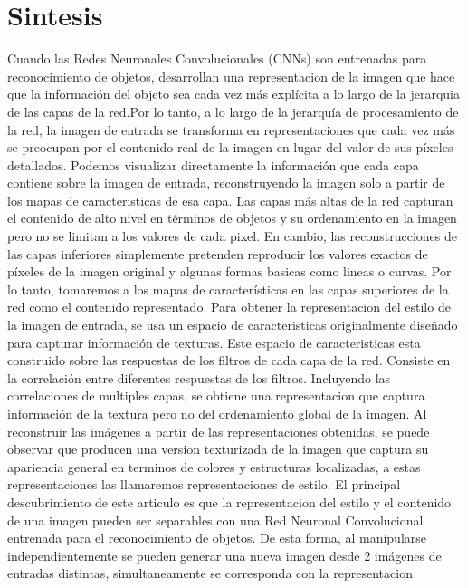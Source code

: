 \documentclass[a4paper,11pt,spanish]{book}
\begin{document}
    \section{Sintesis}
      Cuando las Redes Neuronales Convolucionales (CNNs) son entrenadas para reconocimiento de objetos, desarrollan una representacion de la imagen que hace que la información
      del objeto sea cada vez más explícita a lo largo de la jerarquia de las capas de la red.Por lo tanto, a lo largo de la jerarquía de procesamiento de la red,
      la imagen de entrada se transforma en representaciones que cada vez más se preocupan por el contenido real de la imagen en lugar del valor de sus píxeles detallados.
      Podemos visualizar directamente la información que cada capa contiene sobre la imagen de entrada, reconstruyendo la imagen solo a partir de los mapas de caracteristicas
      de esa capa. Las capas más altas de la red capturan el contenido de alto nivel en términos de objetos y su ordenamiento en la imagen pero no se limitan a los valores de cada
      pixel. En  cambio, las reconstrucciones de las capas inferiores simplemente pretenden reproducir los valores exactos de píxeles de la imagen original y algunas formas
      basicas como lineas o curvas. Por lo tanto, tomaremos a los mapas de características en las capas superiores de la red como el contenido representado.
      Para obtener la representacion del estilo de la imagen de entrada, se usa un espacio de caracteristicas originalmente diseñado para capturar información de texturas.
      Este espacio de caracteristicas esta construido sobre las respuestas de los filtros de cada capa de la red. Consiste en la correlación entre diferentes respuestas de los filtros.
      Incluyendo las correlaciones de multiples capas, se obtiene una representacion que captura información de la textura pero no del ordenamiento global de la imagen.
      Al reconstruir las imágenes a partir de las representaciones obtenidas, se puede observar que producen una version texturizada de la imagen que captura su
      apariencia general en terminos de colores y estructuras localizadas, a estas representaciones las llamaremos representaciones de estilo.
      El principal descubrimiento de este articulo es que la representacion del estilo y el contenido de una imagen pueden ser separables con una Red Neuronal Convolucional entrenada
      para el reconocimiento de objetos. De esta forma, al manipularse independientemente se pueden generar una nueva imagen desde 2 imágenes de entradas distintas, simultaneamente se corresponda con la representacion
\end{document}
